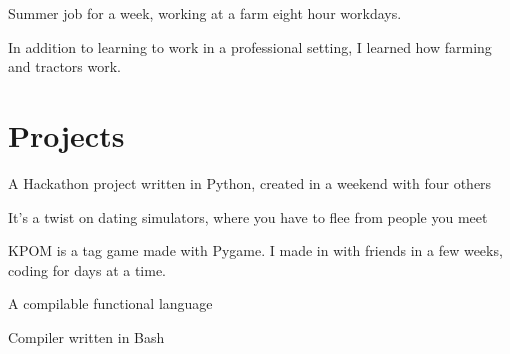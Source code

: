 \documentclass[]{plushcv}
\begin{document}
\begin{minipage}[t]{0.70\textwidth}
\begin{tightemize}
\sectionsep
\item Summer job for a week, working at a farm eight hour workdays.
\item In addition to learning to work in a professional setting, I learned how farming and tractors work.
\end{tightemize}
\sectionsep



\section{Projects}

\begin{tightemize}
\item A Hackathon project written in Python, created in a weekend with four others
\item It's a twist on dating simulators, where you have to flee from people you meet
\end{tightemize}
\sectionsep

\begin{tightemize}
\item KPOM is a tag game made with Pygame. I made in with friends in a few weeks, coding for days at a time.
\end{tightemize}
\sectionsep

\begin{tightemize}
\item A compilable functional language
\item Compiler written in Bash
\end{tightemize}
\sectionsep




%
%

\end{minipage} 
\end{document}
